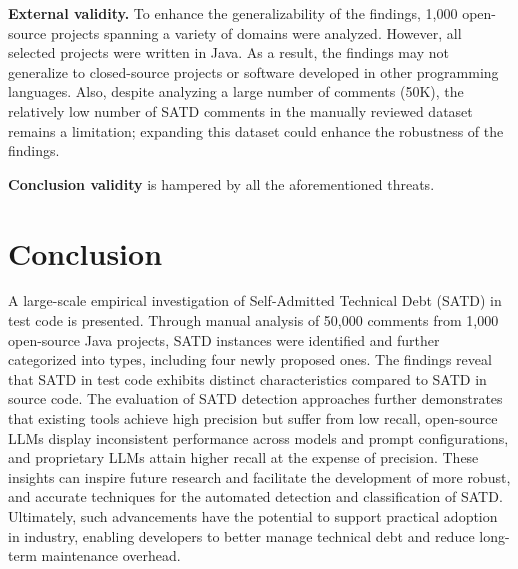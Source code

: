 \textbf{External validity.} To enhance the generalizability of the findings, 1,000 open-source projects spanning a variety of domains were analyzed. However, all selected projects were written in Java. As a result, the findings may not generalize to closed-source projects or software developed in other programming languages. Also, despite analyzing a large number of comments (50K), the relatively low number of SATD comments in the manually reviewed dataset remains a limitation; expanding this dataset could enhance the robustness of the findings.

\textbf{Conclusion validity} is hampered by all the aforementioned threats.
\section{Conclusion}\label{sec:conclusion}
A large-scale empirical investigation of Self-Admitted Technical Debt (SATD) in test code is presented. Through manual analysis of 50,000 comments from 1,000 open-source Java projects, \totalSatdCount{} SATD instances were identified and further categorized into \categoryCount{} types, including four newly proposed ones. The findings reveal that SATD in test code exhibits distinct characteristics compared to SATD in source code. The evaluation of SATD detection approaches further demonstrates that existing tools achieve high precision but suffer from low recall, open-source LLMs display inconsistent performance across models and prompt configurations, and proprietary LLMs attain higher recall at the expense of precision. These insights can inspire future research and facilitate the development of more robust, and accurate techniques for the automated detection and classification of SATD. Ultimately, such advancements have the potential to support practical adoption in industry, enabling developers to better manage technical debt and reduce long-term maintenance overhead.

